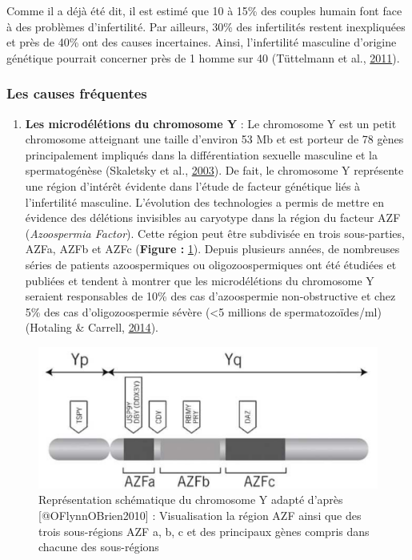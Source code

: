 \documentclass[12pt,twoside]{reedthesis}
\providecommand{\tightlist}{%
  \setlength{\itemsep}{0pt}\setlength{\parskip}{0pt}}
\theoremstyle{definition}
\theoremstyle{definition}
\theoremstyle{remark}
\begin{document}
  Comme il a déjà été dit, il est estimé que 10 à 15\% des couples humain
  font face à des problèmes d'infertilité. Par ailleurs, 30\% des
  infertilités restent inexpliquées et près de 40\% ont des causes
  incertaines. Ainsi, l'infertilité masculine d'origine génétique pourrait
  concerner près de 1 homme sur 40 (Tüttelmann et al.,
  \protect\hyperlink{ref-Tuttelmann2011}{2011}).
  
  \subsubsection{Les causes fréquentes}\label{les-causes-frequentes}
  
  \begin{enumerate}
  \def\labelenumi{\arabic{enumi}.}
  \tightlist
  \item
    \textbf{Les microdélétions du chromosome Y} : Le chromosome Y est un
    petit chromosome atteignant une taille d'environ 53 Mb et est porteur
    de 78 gènes principalement impliqués dans la différentiation sexuelle
    masculine et la spermatogénèse (Skaletsky et al.,
    \protect\hyperlink{ref-Skaletsky2003}{2003}). De fait, le chromosome Y
    représente une région d'intérêt évidente dans l'étude de facteur
    génétique liés à l'infertilité masculine. L'évolution des technologies
    a permis de mettre en évidence des délétions invisibles au caryotype
    dans la région du facteur AZF (\emph{Azoospermia Factor}). Cette
    région peut être subdivisée en trois sous-parties, AZFa, AZFb et AZFc
    (\textbf{Figure :} \ref{fig:chry}). Depuis plusieurs années, de
    nombreuses séries de patients azoospermiques ou oligozoospermiques ont
    été étudiées et publiées et tendent à montrer que les microdélétions
    du chromosome Y seraient responsables de 10\% des cas d'azoospermie
    non-obstructive et chez 5\% des cas d'oligozoospermie sévère
    (\textless{}5 millions de spermatozoïdes/ml) (Hotaling \& Carrell,
    \protect\hyperlink{ref-Hotaling2014}{2014}).
  \end{enumerate}
  
  \newpage
  
  \begin{figure}
  
  {\centering \includegraphics[scale=.45]{figure/chromozomeY} 
  
  }
  
  \caption[Représentation schématique du chromosome Y adapté]{Représentation schématique du chromosome Y adapté d'après [@OFlynnOBrien2010] : Visualisation la région AZF ainsi que des trois sous-régions AZF a, b, c et des principaux gènes compris dans chacune des sous-régions}\label{fig:chry}
  \end{figure}
  
\end{document}
